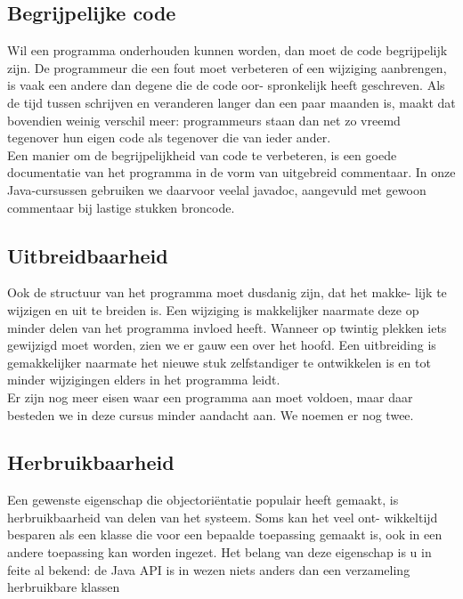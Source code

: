 \documentclass{article}
\begin{document}
	\subsection{Begrijpelijke code}
	
	Wil een programma onderhouden kunnen worden, dan moet de code
	begrijpelijk zijn. De programmeur die een fout moet verbeteren of een
	wijziging aanbrengen, is vaak een andere dan degene die de code oor-
	spronkelijk heeft geschreven. Als de tijd tussen schrijven en veranderen
	langer dan een paar maanden is, maakt dat bovendien weinig verschil
	meer: programmeurs staan dan net zo vreemd tegenover hun eigen code
	als tegenover die van ieder ander. \\
	Een manier om de begrijpelijkheid van code te verbeteren, is een goede
	documentatie van het programma in de vorm van uitgebreid commentaar. In onze Java-cursussen gebruiken we daarvoor veelal javadoc,
	aangevuld met gewoon commentaar bij lastige stukken broncode. \\
	
	\subsection{Uitbreidbaarheid}
	
	Ook de structuur van het programma moet dusdanig zijn, dat het makke-
	lijk te wijzigen en uit te breiden is. Een wijziging is makkelijker naarmate
	deze op minder delen van het programma invloed heeft. Wanneer op
	twintig plekken iets gewijzigd moet worden, zien we er gauw een over
	het hoofd. Een uitbreiding is gemakkelijker naarmate het nieuwe stuk
	zelfstandiger te ontwikkelen is en tot minder wijzigingen elders in het
	programma leidt. \\
	Er zijn nog meer eisen waar een programma aan moet voldoen, maar
	daar besteden we in deze cursus minder aandacht aan. We noemen er
	nog twee. \\
	\subsection{Herbruikbaarheid}
	
	Een gewenste eigenschap die objectori\"{e}ntatie populair heeft gemaakt,
	is herbruikbaarheid van delen van het systeem. Soms kan het veel ont-
	wikkeltijd besparen als een klasse die voor een bepaalde toepassing
	gemaakt is, ook in een andere toepassing kan worden ingezet. Het
	belang van deze eigenschap is u in feite al bekend: de Java API is in
	wezen niets anders dan een verzameling herbruikbare klassen	
	
\end{document}
